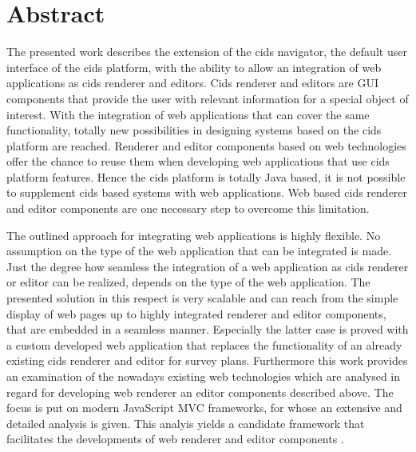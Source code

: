 \chapter*{Abstract}

The presented work describes the extension of the cids navigator, the default user interface of the cids platform, with the ability to allow an integration of web applications as cids renderer and editors. 
Cids renderer and editors are GUI components that provide the user with relevant information for a special object of interest. 
With the integration of web applications that can cover the same functionality, totally new possibilities in designing systems based on the cids platform are reached. 
Renderer and editor components based on web technologies offer the chance to reuse them when developing web applications that use cids platform features. 
Hence the cids platform is totally Java based, it is not possible to supplement cids based systems with web applications. 
Web based cids renderer and editor components are one necessary step to overcome this limitation.

The outlined approach for integrating web applications is highly flexible. 
No assumption on the type of the web application that can be integrated is made. 
Just the degree how seamless the integration of a web application as cids renderer or editor can be realized, depends on the type of the web application. 
The presented solution in this respect is very scalable and can reach from the simple display of web pages up to highly integrated renderer and editor components, that are embedded in a seamless manner. 
Especially the latter case is proved with a custom developed web application that replaces the functionality of an already existing cids renderer and editor for survey plans.
Furthermore this work provides an examination of the nowadays existing web technologies which are analysed in regard for developing web renderer an editor components described above. 
The focus is put on modern JavaScript MVC frameworks, for whose an extensive and detailed analysis is given. 
This analyis yields a candidate framework that facilitates the developments of web renderer and editor components .

